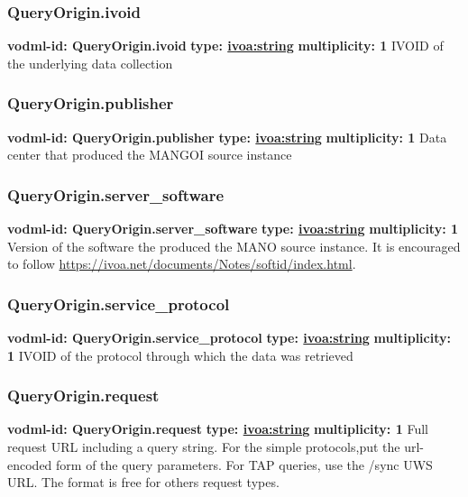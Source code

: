     \subsubsection{QueryOrigin.ivoid}
      \textbf{vodml-id: QueryOrigin.ivoid} \newline
      \textbf{type: \hyperref[sect:ivoa]{ivoa:string}} \newline
      \textbf{multiplicity: 1} \newline
      IVOID of the underlying data collection

    \subsubsection{QueryOrigin.publisher}
      \textbf{vodml-id: QueryOrigin.publisher} \newline
      \textbf{type: \hyperref[sect:ivoa]{ivoa:string}} \newline
      \textbf{multiplicity: 1} \newline
      Data center that produced the MANGOI source instance

    \subsubsection{QueryOrigin.server\_software}
      \textbf{vodml-id: QueryOrigin.server\_software} \newline
      \textbf{type: \hyperref[sect:ivoa]{ivoa:string}} \newline
      \textbf{multiplicity: 1} \newline
      Version of the software the produced the MANO source instance. It is encouraged to follow \url{https://ivoa.net/documents/Notes/softid/index.html}.

    \subsubsection{QueryOrigin.service\_protocol}
      \textbf{vodml-id: QueryOrigin.service\_protocol} \newline
      \textbf{type: \hyperref[sect:ivoa]{ivoa:string}} \newline
      \textbf{multiplicity: 1} \newline
      IVOID of the protocol through which the data was retrieved

    \subsubsection{QueryOrigin.request}
      \textbf{vodml-id: QueryOrigin.request} \newline
      \textbf{type: \hyperref[sect:ivoa]{ivoa:string}} \newline
      \textbf{multiplicity: 1} \newline
      Full request URL including a query string. For the simple protocols,put the url-encoded form of the query parameters. For TAP queries, use the /sync UWS URL. The format is free for others request types.

